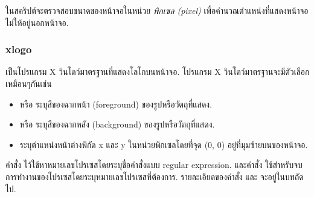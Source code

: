 \begin{thwbr}
\begin{MyExample}
\end{MyExample}%

ในสคริปต์จะตรวจสอบขนาดของหน้าจอในหน่วย \emph{พิกเซล (pixel)} %
%
เพื่อคำนวณตำแหน่งที่แสดงหน้าจอ  ไม่ให้อยู่นอกหน้าจอ.

\subsubsection{xlogo}
 เป็นโปรแกรม X วินโดว์มาตรฐานที่แสดงโลโกบนหน้าจอ. โปรแกรม X วินโดว์มาตรฐานจะมีตัวเลือกเหมือนๆกันเช่น
\begin{itemize}
\item {} หรือ  ระบุสีของฉากหน้า (foreground) ของรูปหรือวัตถุที่แสดง.
\item {} หรือ  ระบุสีของฉากหลัง (background) ของรูปหรือวัตถุที่แสดง.
\item {} ระบุตำแหน่งหน้าต่างพิกัด x และ y ในหน่วยพิกเซลโดยที่จุด (0, 0) อยู่ที่มุมซ้ายบนของหน้าจอ. 
\end{itemize}

\begin{figure}[!htb]
\end{figure}


\medskip
คำสั่ง  ไว้ใช้หาหมายเลขโปรเซสโดยระบุชื่อคำสั่งแบบ regular expression. และคำสั่ง  ใช้สำหรับจบการทำงานของโปรเซสโดยระบุหมายเลขโปรเซสที่ต้องการ. รายละเอียดของคำสั่ง  และ  จะอยู่ในบทถัดไป.


\end{thwbr}
